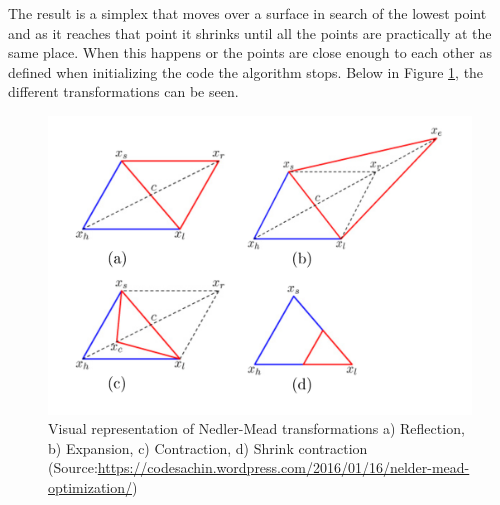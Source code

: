The result is a simplex that moves over a surface in search of the lowest point and as it reaches that point it shrinks until all the points are practically at the same place. When this happens or the points are close enough to each other as defined when initializing the code the algorithm stops. Below in Figure \ref{neldermeadfig}, the different transformations can be seen.

\begin{figure}\label{neldermeadfig}
\centering
\includegraphics[width=\linewidth]{figures/MAP_expl.png}
\caption{Visual representation of Nedler-Mead transformations a) Reflection, b) Expansion, c) Contraction, d) Shrink contraction (Source:\url{https://codesachin.wordpress.com/2016/01/16/nelder-mead-optimization/})}
\end{figure}


